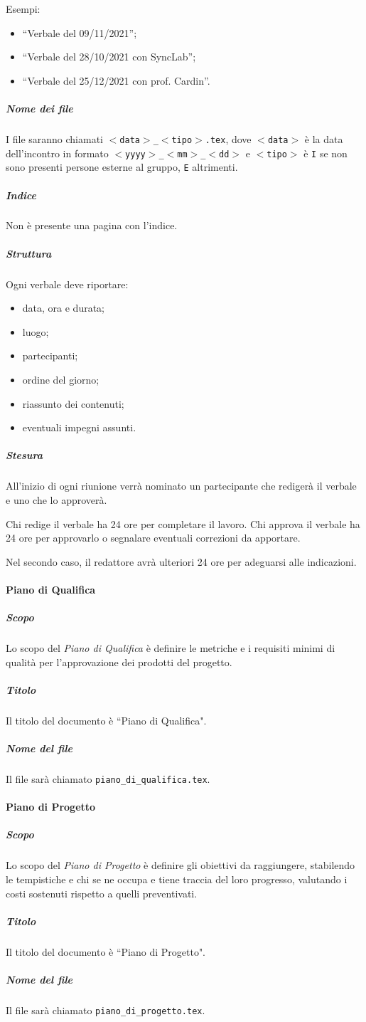 \documentclass[a4paper, 12pt]{article}
\begin{document}
Esempi:
\begin{itemize}
\item ``Verbale del 09/11/2021'';
\item ``Verbale del 28/10/2021 con SyncLab'';
\item ``Verbale del 25/12/2021 con prof. Cardin''.
\end{itemize}
\subparagraph{Nome dei file}
I file saranno chiamati \texttt{$<$data$>$\_$<$tipo$>$.tex}, dove \texttt{$<$data$>$} è la data dell'incontro in formato \texttt{$<$yyyy$>$\_$<$mm$>$\_$<$dd$>$} e \texttt{$<$tipo$>$} è \texttt{I} se non sono presenti persone esterne al gruppo, \texttt{E} altrimenti.
\subparagraph{Indice}
Non è presente una pagina con l'indice.
\subparagraph{Struttura}
Ogni verbale deve riportare:
\begin{itemize}
\item data, ora e durata;
\item luogo;
\item partecipanti;
\item ordine del giorno;
\item riassunto dei contenuti;
\item eventuali impegni assunti.
\end{itemize}
\subparagraph{Stesura}\label{documentazione-documenti-verbali-stesura}
All'inizio di ogni riunione verrà nominato un partecipante che redigerà il verbale e uno che lo approverà.

Chi redige il verbale ha 24 ore per completare il lavoro. Chi approva il verbale ha 24 ore per approvarlo o segnalare eventuali correzioni da apportare.

Nel secondo caso, il redattore avrà ulteriori 24 ore per adeguarsi alle indicazioni.

\paragraph{Piano di Qualifica}\label{documentazione-documenti-piano-di-qualifica}
\subparagraph{Scopo}
Lo scopo del \textit{Piano di Qualifica} è definire le metriche e i requisiti minimi di qualità per l'approvazione dei prodotti del progetto.
\subparagraph{Titolo}
Il titolo del documento è ``Piano di Qualifica".
\subparagraph{Nome del file}
Il file sarà chiamato \texttt{piano\_di\_qualifica.tex}.

\paragraph{Piano di Progetto}\label{piano-di-progetto}
\subparagraph{Scopo}
Lo scopo del \textit{Piano di Progetto} è definire gli obiettivi da raggiungere, stabilendo le tempistiche e chi se ne occupa e tiene traccia del loro progresso, valutando i costi sostenuti rispetto a quelli preventivati.
\subparagraph{Titolo}
Il titolo del documento è ``Piano di Progetto".
\subparagraph{Nome del file}
Il file sarà chiamato \texttt{piano\_di\_progetto.tex}.
\end{document}
